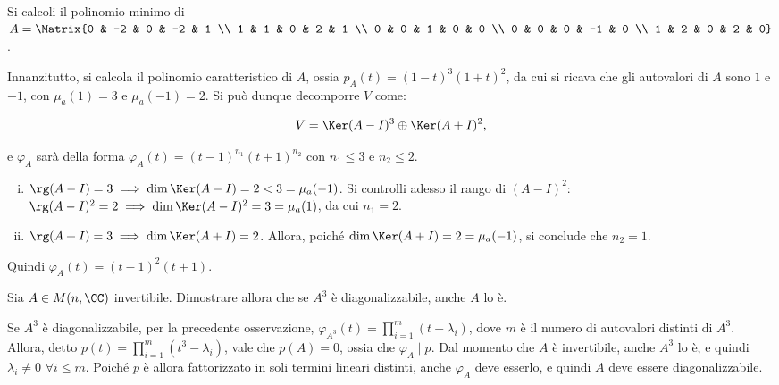 \documentclass[11pt]{article}
\begin{document}
	\begin{exercise}
		Si calcoli il polinomio minimo di $A = \Matrix{0 & -2 & 0 & -2 & 1 \\ 1 & 1 & 0 & 2 & 1 \\ 0 & 0 & 1 & 0 & 0 \\ 0 & 0 & 0 & -1 & 0 \\ 1 & 2 & 0 & 2 & 0}$.
	\end{exercise}

	\begin{solution}
		Innanzitutto, si calcola il polinomio caratteristico di $A$, ossia $p_A(t) = (1-t)^3 (1+t)^2$, da cui si ricava
		che gli autovalori di $A$ sono $1$ e $-1$, con $\mu_a(1) = 3$ e $\mu_a(-1) = 2$. Si può dunque decomporre $V$
		come:
		
		\[ V = \Ker (A - I)^3 \oplus \Ker (A + I)^2, \]
		
		\vskip 0.05in
		
		e $\varphi_A$ sarà della forma $\varphi_A(t) = (t-1)^{n_1} (t+1)^{n_2}$ con $n_1 \leq 3$ e $n_2 \leq 2$.
		\begin{enumerate}[(i)]
			\item $\rg(A - I) = 3 \implies \dim \Ker (A - I) = 2 < 3 = \mu_a(-1)$. Si controlli adesso il rango di
			$(A-I)^2$: $\rg(A - I)^2 = 2 \implies \dim \Ker (A - I)^2 = 3 = \mu_a(1)$, da cui $n_1 = 2$. 
			\item $\rg(A + I) = 3 \implies \dim \Ker (A + I) = 2$. Allora, poiché $\dim \Ker (A + I) = 2 = \mu_a(-1)$,
			si conclude che $n_2 = 1$.
		\end{enumerate}
	
		Quindi $\varphi_A(t) = (t-1)^2(t+1)$.
	\end{solution}
	
	\begin{exercise}
		Sia $A \in M(n, \CC)$ invertibile. Dimostrare allora che se $A^3$ è diagonalizzabile, anche $A$ lo è. 
	\end{exercise}

	\begin{solution}
		Se $A^3$ è diagonalizzabile, per la precedente osservazione, $\varphi_{A^3}(t) = \prod_{i=1}^m (t - \lambda_i)$,
		dove $m$ è il numero di autovalori distinti di $A^3$. Allora, detto $p(t) = \prod_{i=1}^m (t^3 - \lambda_i)$, vale che
		$p(A) = 0$, ossia che $\varphi_A \mid p$. Dal momento che $A$ è invertibile, anche $A^3$ lo è, e quindi
		$\lambda_i \neq 0$ $\forall i \leq m$. Poiché $p$ è allora fattorizzato in soli termini lineari distinti,
		anche $\varphi_A$ deve esserlo, e quindi $A$ deve essere diagonalizzabile. \\
	\end{solution}
\end{document}
